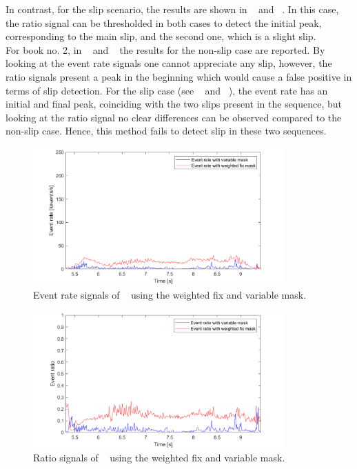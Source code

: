 In contrast, for the slip scenario, the results are shown in ~ and ~. In this case, the ratio signal can be thresholded in both cases to detect the initial peak, corresponding to the main slip, and the second one, which is a slight slip.\\

For book no. 2, in ~ and ~ the results for the non-slip case are reported. By looking at the event rate signals one cannot appreciate any slip, however, the ratio signals present a peak in the beginning which would cause a false positive in terms of slip detection. For the slip case (see ~ and ~), the event rate has an initial and final peak, coinciding with the two slips present in the sequence, but looking at the ratio signal no clear differences can be observed compared to the non-slip case. Hence, this method fails to detect slip in these two sequences.

\begin{figure}[H]
    \centering
    \includegraphics[width=0.86\textwidth]{resources/images/var_mask_hb1_no_slip_evr}
    \caption{Event rate signals of ~ using the weighted fix and variable mask.}\label{fig:var_mask_hb1_no_slip_evr}
\end{figure}

\begin{figure}[H]
    \centering
    \includegraphics[width=0.86\textwidth]{resources/images/var_mask_hb1_no_slip_rat}
    \caption{Ratio signals of ~ using the weighted fix and variable mask.}\label{fig:var_mask_hb1_no_slip_rat}
\end{figure}

